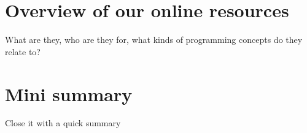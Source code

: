 \section{Overview of our online resources}
What are they, who are they for, what kinds of programming concepts do they relate to?

\section{Mini summary}
Close it with a quick summary

